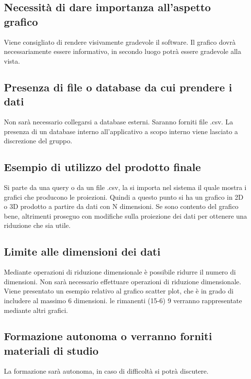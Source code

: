 \documentclass{article}
\begin{document}
    \subsection{Necessità di dare importanza all'aspetto grafico}
    \label{sub:domanda_11}
    Viene consigliato di rendere visivamente gradevole il software. Il grafico dovrà necessariamente essere informativo, in secondo luogo potrà essere gradevole alla vista.

    \subsection{Presenza di file o database da cui prendere i dati}
    \label{sub:domanda_12}
    Non sarà necessario collegarsi a database esterni. Saranno forniti file .csv. La presenza di un database interno all'applicativo a scopo interno viene lasciato a discrezione del gruppo.

    \subsection{Esempio di utilizzo del prodotto finale}
    \label{sub:domanda_13}
    Si parte da una query o da un file .csv, la si importa nel sistema il quale mostra i grafici che producono le proiezioni. Quindi a questo punto si ha un grafico in 2D o 3D prodotto a partire da dati con N dimensioni. Se sono contento del grafico bene, altrimenti proseguo con modifiche sulla proiezione dei dati per ottenere una riduzione che sia utile.

    \subsection{Limite alle dimensioni dei dati}
    \label{sub:domanda_14}
    Mediante operazioni di riduzione dimensionale è possibile ridurre il numero di dimensioni. Non sarà necessario effettuare operazioni di riduzione dimensionale.
    Viene presentato un esempio relativo al grafico scatter plot, che è in grado di includere al massimo 6 dimensioni. le rimanenti (15-6) 9 verranno rappresentate mediante altri grafici.

    \subsection{Formazione autonoma o verranno forniti materiali di studio}
    \label{sub:domanda_15}
    La formazione sarà autonoma, in caso di difficoltà si potrà discutere.
\end{document}
